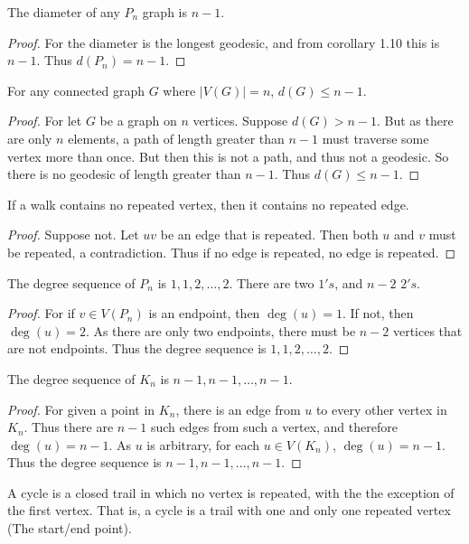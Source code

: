     \begin{theorem}
    The diameter of any $P_n$ graph is $n-1$.
    \end{theorem}
    \begin{proof}
    For the diameter is the longest geodesic, and from corollary 1.10 this is $n-1$. Thus $d(P_n) = n-1$.
    \end{proof}
    \begin{theorem}
    For any connected graph $G$ where $|V(G)| = n$, $d(G) \leq n-1$.
    \end{theorem}
    \begin{proof}
    For let $G$ be a graph on $n$ vertices. Suppose $d(G)>n-1$. But as there are only $n$ elements, a path of length greater than $n-1$ must traverse some vertex more than once. But then this is not a path, and thus not a geodesic. So there is no geodesic of length greater than $n-1$. Thus $d(G)\leq n-1$.
    \end{proof}
    \begin{theorem}
    If a walk contains no repeated vertex, then it contains no repeated edge.
    \end{theorem}
    \begin{proof}
    Suppose not. Let $uv$ be an edge that is repeated. Then both $u$ and $v$ must be repeated, a contradiction. Thus if no edge is repeated, no edge is repeated.
    \end{proof}
    \begin{theorem}
    The degree sequence of $P_n$ is $1,1,2,\hdots, 2$. There are two $1's$, and $n-2$ $2's$.
    \end{theorem}
    \begin{proof}
    For if $v\in V(P_n)$ is an endpoint, then $\deg(u) = 1$. If not, then $\deg(u) = 2$. As there are only two endpoints, there must be $n-2$ vertices that are not endpoints. Thus the degree sequence is $1,1,2,\hdots,2$.
    \end{proof}
    \begin{theorem}
    The degree sequence of $K_n$ is $n-1,n-1,\hdots, n-1$.
    \end{theorem}
    \begin{proof}
    For given a point in $K_n$, there is an edge from $u$ to every other vertex in $K_n$. Thus there are $n-1$ such edges from such 
    a vertex, and therefore $\deg(u) = n-1$. As $u$ is arbitrary, for each $u\in V(K_n)$, $\deg(u) = n-1$. Thus the degree sequence is $n-1,n-1,\hdots, n-1$.
    \end{proof}
    \begin{definition}
    A cycle is a closed trail in which no vertex is repeated, with the the exception of the first vertex. That is, a cycle is a trail with one and only one repeated vertex (The start/end point).
    \end{definition}
